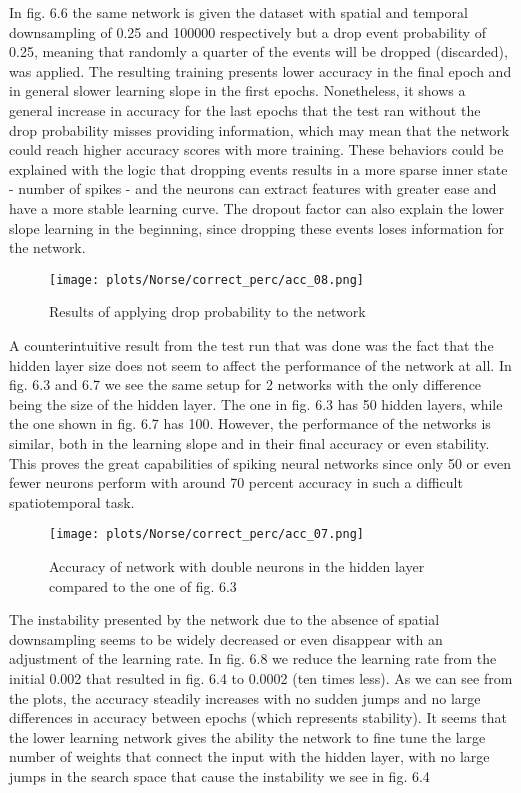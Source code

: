 \documentclass[12pt]{report}
\begin{document}
In fig. 6.6 the same network is given the dataset with spatial and temporal downsampling of 0.25 and 100000 respectively but a drop event probability of 0.25, meaning that randomly a quarter of the events will be dropped (discarded), was applied. The resulting training presents lower accuracy in the final epoch and in general slower learning slope in the first epochs. Nonetheless, it shows a general increase in accuracy for the last epochs that the test ran without the drop probability misses providing information, which may mean that the network could reach higher accuracy scores with more training. These behaviors could be explained with the logic that dropping events results in a more sparse inner state - number of spikes - and the neurons can extract features with greater ease and have a more stable learning curve. The dropout factor can also explain the lower slope learning in the beginning, since dropping these events loses information for the network.

\begin{figure}[htp] %
    \centering
     \texttt{[image: plots/Norse/correct\_perc/acc\_08.png]}
    \caption{Results of applying drop probability to the network}
    \label{fig:representation-methods}
\end{figure}


A counterintuitive result from the test run that was done was the fact that the hidden layer size does not seem to affect the performance of the network at all. In fig. 6.3 and 6.7 we see the same setup for 2 networks with the only difference being the size of the hidden layer. The one in fig. 6.3 has 50 hidden layers, while the one shown in fig. 6.7 has 100. However, the performance of the networks is similar, both in the learning slope and in their final accuracy or even stability. This proves the great capabilities of spiking neural networks since only 50 or even fewer neurons perform with around 70 percent accuracy in such a difficult spatiotemporal task.

\begin{figure}[htp] %
    \centering
     \texttt{[image: plots/Norse/correct\_perc/acc\_07.png]}
    \caption{Accuracy of network with double neurons in the hidden layer compared to the one of fig. 6.3}
    \label{fig:representation-methods}
\end{figure}


The instability presented by the network due to the absence of spatial downsampling seems to be widely decreased or even disappear with an adjustment of the learning rate. In fig. 6.8 we reduce the learning rate from the initial 0.002 that resulted in fig. 6.4 to 0.0002 (ten times less). As we can see from the plots, the accuracy steadily increases with no sudden jumps and no large differences in accuracy between epochs (which represents stability). It seems that the lower learning network gives the ability the network to fine tune the large number of weights that connect the input with the hidden layer, with no large jumps in the search space that cause the instability we see in fig. 6.4
\end{document}
